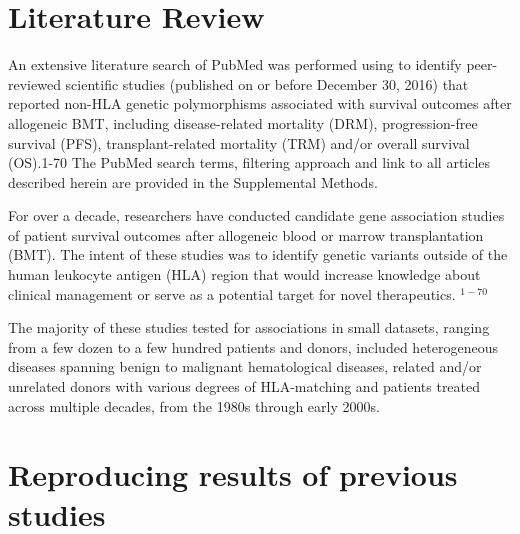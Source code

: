 \documentclass[]{DissertateUSU}
\begin{document}
\section{Literature Review}\label{literature-review}

An extensive literature search of PubMed was performed using to identify
peer-reviewed scientific studies (published on or before December 30,
2016) that reported non-HLA genetic polymorphisms associated with
survival outcomes after allogeneic BMT, including disease-related
mortality (DRM), progression-free survival (PFS), transplant-related
mortality (TRM) and/or overall survival (OS).1-70 The PubMed search
terms, filtering approach and link to all articles described herein are
provided in the Supplemental Methods.

For over a decade, researchers have conducted candidate gene association
studies of patient survival outcomes after allogeneic blood or marrow
transplantation (BMT). The intent of these studies was to identify
genetic variants outside of the human leukocyte antigen (HLA) region
that would increase knowledge about clinical management or serve as a
potential target for novel therapeutics. \(^{1-70}\)

The majority of these studies tested for associations in small datasets,
ranging from a few dozen to a few hundred patients and donors, included
heterogeneous diseases spanning benign to malignant hematological
diseases, related and/or unrelated donors with various degrees of
HLA-matching and patients treated across multiple decades, from the
1980s through early 2000s.

\section{Reproducing results of previous
studies}\label{reproducing-results-of-previous-studies}
\end{document}
